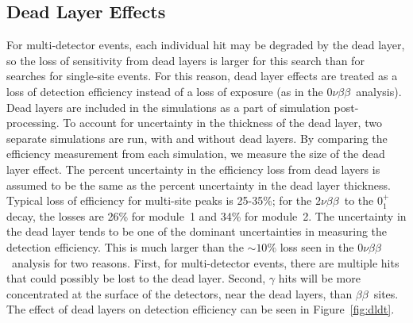 \documentclass[notitlepage,rmp,aps,10pt]{revtex4-1}
\newcommand{\bb}{${\beta \beta}$}
\newcommand{\znbb}{${0 \nu \beta \beta}$}
\newcommand{\tnbb}{${2 \nu \beta \beta}$}
\newcommand{\bbes}{\bb~E.S.}
\newcommand{\SP}[3]{$#1^{#2}_{#3}$}
\begin{document}
\begin{table}
  \caption[List of subdatasets, livetimes, efficiency and exposure]{\label{tab:subdatasets}
    List of each subdataset, labelled by the bitmasks defined in equation~\ref{eq:sdsbitmask}, with its livetime, detection efficiency measured for the \bbes\ to \SP{0}{+}{1} decay, and total isotopic exposure. Note the large amount of variance in the detection efficiency.
  }
  \scriptsize
  
\end{table}

\subsection{Dead Layer Effects} \label{sec:DL}
For multi-detector events, each individual hit may be degraded by the dead layer, so the loss of sensitivity from dead layers is larger for this search than for searches for single-site events.
For this reason, dead layer effects are treated as a loss of detection efficiency instead of a loss of exposure (as in the \znbb\ analysis).
Dead layers are included in the simulations as a part of simulation post-processing.
To account for uncertainty in the thickness of the dead layer, two separate simulations are run, with and without dead layers.
By comparing the efficiency measurement from each simulation, we measure the size of the dead layer effect.
The percent uncertainty in the efficiency loss from dead layers is assumed to be the same as the percent uncertainty in the dead layer thickness.
Typical loss of efficiency for multi-site peaks is 25-35\%; for the \tnbb\ to the \SP{0}{+}{1} decay, the losses are 26\% for module~1 and 34\% for module~2.
The uncertainty in the dead layer tends to be one of the dominant uncertainties in measuring the detection efficiency.
This is much larger than the ${\sim}10\%$ loss seen in the \znbb\ analysis for two reasons.
First, for multi-detector events, there are multiple hits that could possibly be lost to the dead layer.
Second, $\gamma$ hits will be more concentrated at the surface of the detectors, near the dead layers, than \bb\ sites.
The effect of dead layers on detection efficiency can be seen in Figure~\ref{fig:dldt}.
\end{document}
